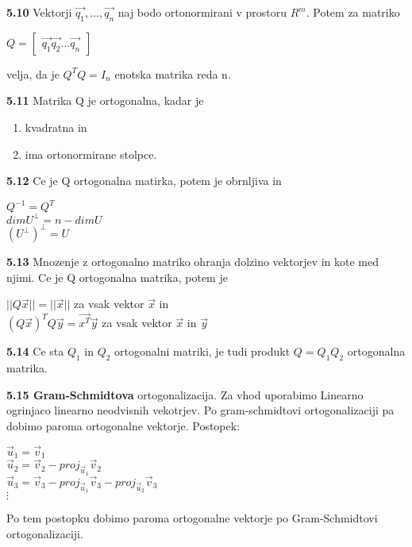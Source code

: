 \documentclass{article}
\begin{document}
\begin{multicols}{2}
	\textbf{5.10} Vektorji $\vec{q_{1}}, \dots, \vec{q_{n}}$ naj bodo ortonormirani v prostoru $R^{m}$. Potem
	za matriko
	\begin{center}
		$Q = \begin{bmatrix}
				\vec{q_{1}} \vec{q_{2}} \dots \vec{q_{n}}
			\end{bmatrix}$
	\end{center}
	velja, da je $Q^{T}Q = I_{n}$ enotska matrika reda n.

	\textbf{5.11} Matrika Q je ortogonalna, kadar je
	\begin{enumerate}
		\item kvadratna in
		\item ima ortonormirane stolpce.
	\end{enumerate}

	\textbf{5.12} Ce je Q ortogonalna matirka, potem je obrnljiva in
	\begin{center}
		$Q^{-1} = Q^{T}$\\
		$dimU^{\perp} = n - dimU$\\
		$(U^{\perp})^{\perp} = U$
	\end{center}

	\textbf{5.13} Mnozenje z ortogonalno matriko ohranja dolzino vektorjev in kote med njimi. Ce je Q
	ortogonalna matrika, potem je
	\begin{center}
		$|| Q \vec{x} || = || \vec{x} ||$ za vsak vektor $\vec{x}$ in\\
		$(Q\vec{x})^{T}Q\vec{y} = \vec{x^{T}} \vec{y}$ za vsak vektor $\vec{x}$ in $\vec{y}$
	\end{center}

	\textbf{5.14} Ce sta $Q_{1}$ in $Q_{2}$ ortogonalni matriki, je tudi produkt $Q = Q_{1}Q_{2}$ ortogonalna
	matrika.

	\textbf{5.15 Gram-Schmidtova} ortogonalizacija. Za vhod uporabimo Linearno ogrinjaco linearno neodvisnih vekotrjev. Po
	gram-schmidtovi ortogonalizaciji pa dobimo paroma ortogonalne vektorje.
	Postopek:
	\begin{center}
		\begin{math}
			\vec{u}_{1} = \vec{v}_{1}
		\end{math}\\
		\begin{math}
			\vec{u}_{2} = \vec{v}_{2} - proj_{\vec{u}_{1}}\vec{v}_{2}
		\end{math}\\
		\begin{math}
			\vec{u}_{3} = \vec{v}_{3} - proj_{\vec{u}_{1}}\vec{v}_{3} - proj_{\vec{u}_{2}}\vec{v}_{3}
		\end{math}\\
		\begin{math}
			\vdots
		\end{math}
	\end{center}
	Po tem postopku dobimo paroma ortogonalne vektorje po Gram-Schmidtovi ortogonalizaciji.



\end{multicols}
\end{document}
